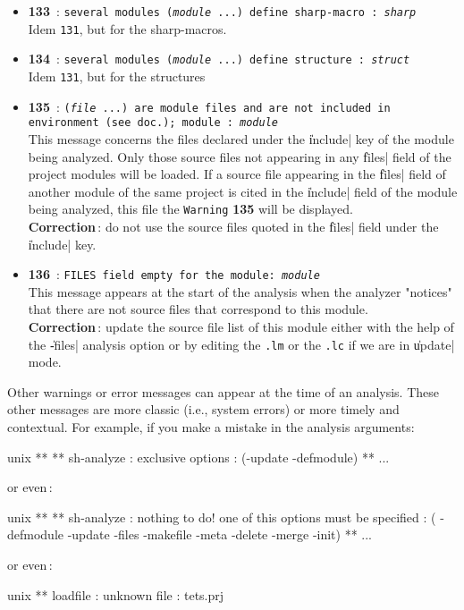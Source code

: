 \begin{itemize}
\item {\Large {\bf 133}}\ : {\tt several modules ({\em module} ...) define
sharp-macro : {\em sharp}}\\
Idem {\tt 131}, but for the sharp-macros.

\item {\Large {\bf 134}}\ : {\tt several modules ({\em module} ...) define
structure : {\em struct}}\\
Idem {\tt 131}, but for the structures

\item {\Large {\bf 135}}\ : {\tt ({\em file} ...) are module files and are not
included in environment (see doc.); module : {\em module}}\\
This message concerns the files declared under the \|include| key of the module being analyzed.  Only those source files not appearing in any \|files| field of the project modules will be loaded.  If a source file appearing in the \|files| field of another module of the same project is cited in the \|include| field of the module being analyzed, this file the {\tt Warning} {\bf 135} will be displayed.\\  
{\bf Correction}\,: do not use the source files quoted in the \|files| field under the \|include| key.  

\item {\Large {\bf 136}}\ : {\tt FILES field empty for the module: {\em module}}\\
This message appears at the start of the analysis when the analyzer "notices" that there are not source files that correspond to this module.\\
{\bf Correction}\,: update the source file list of this module either with the help of the \|-files| analysis option or by editing the {\tt .lm} or the {\tt .lc} if we are in \|update| mode. 

\end{itemize}

Other warnings or error messages can appear at the time of an analysis.  These other messages are more classic (i.e., system errors) or more timely and contextual.  For example, if you make a mistake in the analysis arguments:

\begin{Longcode*}
unix%
**
** sh-analyze : exclusive options : (-update -defmodule)
**
 ...
\end{Longcode*}
or even\,:
\begin{Longcode*}
unix%
**
** sh-analyze : nothing to do! one of this options must be specified : (
-defmodule -update -files -makefile -meta -delete -merge -init)
**
 ...
\end{Longcode*}
or even\,:
\begin{Longcode*}
unix%
** loadfile : unknown file : tets.prj
\end{Longcode*}
